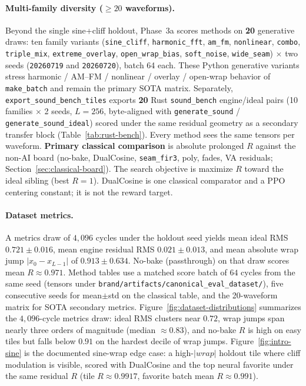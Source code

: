 \paragraph{Multi-family diversity ($\ge 20$ waveforms).}
Beyond the single sine{+}cliff holdout, Phase~3a scores methods on \textbf{20} generative draws: ten family variants (\texttt{sine\_cliff}, \texttt{harmonic\_fft}, \texttt{am\_fm}, \texttt{nonlinear}, \texttt{combo}, \texttt{triple\_mix}, \texttt{extreme\_overlay}, \texttt{open\_wrap\_bias}, \texttt{soft\_noise}, \texttt{wide\_seam}) $\times$ two seeds (\texttt{20260719} and \texttt{20260720}), batch 64 each.
These Python generative variants stress harmonic / AM--FM / nonlinear / overlay / open-wrap behavior of \texttt{make\_batch} and remain the primary SOTA matrix.
Separately, \texttt{export\_sound\_bench\_tiles} exports \textbf{20} Rust \texttt{sound\_bench} engine/ideal pairs (10 families $\times$ 2 seeds, $L{=}256$, byte-aligned with \texttt{generate\_sound} / \texttt{generate\_sound\_ideal}) scored under the same residual geometry as a secondary transfer block (Table~\ref{tab:rust-bench}).
Every method sees the same tensors per waveform.
\textbf{Primary classical comparison} is absolute prolonged $R$ against the non-AI board (no-bake, DualCosine, \texttt{seam\_fir3}, poly, fades, VA residuals; Section~\ref{sec:classical-board}).
The search objective is maximize $R$ toward the ideal sibling (best $R{=}1$).
DualCosine is one classical comparator and a PPO centering constant; it is not the reward target.

\paragraph{Dataset metrics.}
A metrics draw of $4{,}096$ cycles under the holdout seed yields mean ideal RMS $0.721\pm0.016$, mean engine residual RMS $0.021\pm0.013$, and mean absolute wrap jump $|x_0-x_{L-1}|$ of $0.913\pm0.634$.
No-bake (passthrough) on that draw scores mean $R\approx0.971$.
Method tables use a matched score batch of $64$ cycles from the same seed (tensors under \texttt{brand/artifacts/canonical\_eval\_dataset/}), five consecutive seeds for mean$\pm$std on the classical table, and the 20-waveform matrix for SOTA secondary metrics.
Figure~\ref{fig:dataset-distributions} summarizes the $4{,}096$-cycle metrics draw: ideal RMS clusters near $0.72$, wrap jumps span nearly three orders of magnitude (median $\approx 0.83$), and no-bake $R$ is high on easy tiles but falls below $0.91$ on the hardest decile of wrap jumps.
Figure~\ref{fig:intro-sine} is the documented sine-wrap edge case: a high-$|wrap|$ holdout tile where cliff modulation is visible, scored with DualCosine and the top neural favorite under the same residual $R$ (tile $R\approx0.9917$, favorite batch mean $R\approx0.991$).

